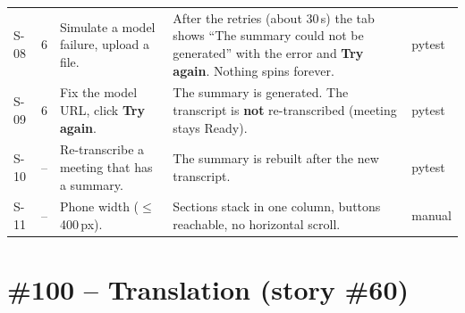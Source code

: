 \documentclass[12pt,a4paper]{report}
\newcommand{\ui}[1]{\textbf{#1}}
\begin{document}
\begin{longtable}{@{}P{1.1cm}Q{0.7cm}P{4.5cm}P{5.8cm}P{2.5cm}@{}}
  S-08 & 6 & Simulate a model failure, upload a file. & After the retries (about 30\,s) the tab shows ``The summary
    could not be generated'' with the error and \ui{Try again}. Nothing spins forever. & pytest \\
  S-09 & 6 & Fix the model URL, click \ui{Try again}. & The summary is generated. The transcript is \textbf{not}
    re-transcribed (meeting stays Ready). & pytest \\
  S-10 & -- & Re-transcribe a meeting that has a summary. & The summary is rebuilt after the new transcript.
    & pytest \\
  S-11 & -- & Phone width ($\leq$ 400\,px). & Sections stack in one column, buttons reachable, no horizontal
    scroll. & manual \\
\end{longtable}
\endgroup

\section{\#100 -- Translation (story \#60)}
\end{document}
